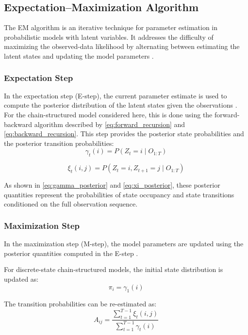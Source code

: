 \subsection{Expectation–Maximization Algorithm}
\label{sec:em_algorithm}
The \ac{EM} algorithm is an iterative technique for parameter estimation in probabilistic models with latent variables. 
It addresses the difficulty of maximizing the observed-data likelihood by alternating between estimating the latent states and updating the model parameters \cite{Murphy2012MachineL}.



\subsubsection{Expectation Step}

In the expectation step (E-step), the current parameter estimate is used to compute the posterior distribution of the latent states given the observations \cite{Murphy2012MachineL}. 
For the chain-structured model considered here, this is done using the forward-backward algorithm described by \eqref{eq:forward_recursion} and \eqref{eq:backward_recursion}. 
This step provides the posterior state probabilities and the posterior transition probabilities:
\[
\gamma_t(i) = P(Z_t = i \mid O_{1:T})
\]

\[
\xi_t(i,j) = P(Z_t = i, Z_{t+1} = j \mid O_{1:T})
\]


\par As shown in \eqref{eq:gamma_posterior} and \eqref{eq:xi_posterior}, these posterior quantities represent the probabilities of state occupancy and state transitions 
conditioned on the full observation sequence.

\subsubsection{Maximization Step}

In the maximization step (M-step), the model parameters are updated using the posterior quantities computed in the E-step \cite{Murphy2012MachineL}. 

\par For discrete-state chain-structured models, the initial state distribution is updated as:
\begin{equation}
\pi_i = \gamma_1(i)
\label{eq:em_initial_update}
\end{equation}

\par The transition probabilities can be re-estimated as:
\begin{equation}
A_{ij}
=
\frac{\sum_{t=1}^{T-1} \xi_t(i,j)}
{\sum_{t=1}^{T-1} \gamma_t(i)}
\label{eq:em_transition_update}
\end{equation}


